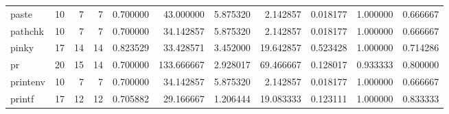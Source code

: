 \begin{longtable}{lrrrrrrrrrr}
paste     &                                      10 &                  7 &                                 7 &                                   0.700000 &                              43.000000 &                                     5.875320 &                          2.142857 &                                0.018177 &                           1.000000 &                                           0.666667 \\
pathchk   &                                      10 &                  7 &                                 7 &                                   0.700000 &                              34.142857 &                                     5.875320 &                          2.142857 &                                0.018177 &                           1.000000 &                                           0.666667 \\
pinky     &                                      17 &                 14 &                                14 &                                   0.823529 &                              33.428571 &                                     3.452000 &                         19.642857 &                                0.523428 &                           1.000000 &                                           0.714286 \\
pr        &                                      20 &                 15 &                                14 &                                   0.700000 &                             133.666667 &                                     2.928017 &                         69.466667 &                                0.128017 &                           0.933333 &                                           0.800000 \\
printenv  &                                      10 &                  7 &                                 7 &                                   0.700000 &                              34.142857 &                                     5.875320 &                          2.142857 &                                0.018177 &                           1.000000 &                                           0.666667 \\
printf    &                                      17 &                 12 &                                12 &                                   0.705882 &                              29.166667 &                                     1.206444 &                         19.083333 &                                0.123111 &                           1.000000 &                                           0.833333 \\

\end{longtable}
